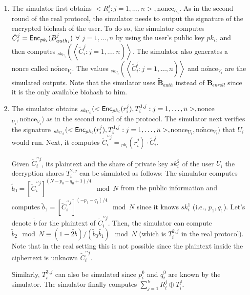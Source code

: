 \documentclass[journal]{IEEEtran}
\begin{document}
\begin{enumerate}

\item The simulator first obtains $<R^{j}_{i}:j =1,\ldots, n>, $nonce$_{U_i}$. As in the second round of the real protocol, the simulator needs to output the signature of the encrypted biohash of the user. To do so, the simulator computes $\tilde{C}^{j}_{i} = \text{\sf Enc}_{pk_i}(B^j_{auth_i})$ $\forall$ $j=1,\ldots,n$ by using the user's public key $pk_i$, and then computes $_{sk_{U_i}}\left(\left\langle \tilde{C}^{j}_{i}:j=1,\ldots,n\right)\right\rangle$. The simulator also generates a nonce called $\tilde{\text{nonce}}$$_{V_i}$.  The values $_{sk_{U_i}}\left(\left\langle \tilde{C}^{j}_{i}:j=1,\ldots,n\right)\right\rangle$ and $\tilde{\text{nonce}}$$_{V_i}$ are the simulated outputs.  Note that the simulator uses $\tilde{\textbf{B}}_{auth}$ instead of \textbf{B}$_{enroll}$ since it is the only available biohash to him.

\item The simulator obtains $_{sk_{U_i}}(<\text{\sf Enc}_{pk_i}(r_i^j),T^{1,j}_i:j =1, \ldots, n>, $nonce$_{U_i}, \tilde{\text{nonce}}_{V_i})$ as in the second round of the protocol.  The simulator next verifies the signature $_{sk_{U_i}}(<\text{\sf Enc}_{pk_i}(r_i^j),T^{1,j}_i:j =1, \ldots, n>, $nonce$_{U_i}, \tilde{\text{nonce}}_{V_i})$ that $U_i$ would run. Next, it computes $\tilde{C}^{\prime \prime j}_i = $$_{pk_i}(r_i^j)\cdot \tilde{C}_i^j$. 

Given $\tilde{C}^{\prime \prime j}_{i}$, its plaintext and the share of private key $sk_i^2$ of the user $U_i$ the decryption shares $T_i^{2,j}$ can be simulated as follows: The simulator computes $\tilde{b}_{0} = [\tilde{C}^{\prime \prime j}_{i}]^{{(N - p_{0} - q_{0} +1)}/4} \mod N$ from the public information and computes $\tilde{b}_{1} = [\tilde{C}^{\prime \prime j}_{i}]^{{(-p_{1}-q_{1})}/4} \mod N$ since it knows $sk_i^1$ (i.e., $p_1, q_1$). Let's denote $\tilde{b}$ for the plaintext of $\tilde{C}^{\prime \prime j}_{i}$. Then, the simulator can compute $\tilde{b}_2 \mod N \equiv (1- \tilde{2b})/(\tilde{b}_0 \tilde{b_1}) \mod N$ (which is $T_i^{2,j}$ in the real protocol). Note that in the real setting this is not possible since the plaintext inside the ciphertext is unknown $\tilde{C}^{\prime \prime j}_{i}$.

Similarly, $T_i^{3,j}$ can also be simulated since $p_i^0$ and $q_i^0$ are known by the simulator. The simulator finally computes $\sum^{k}_{j=1} R_i^j \oplus T_i^j$. 

\end{enumerate}
\end{document}

